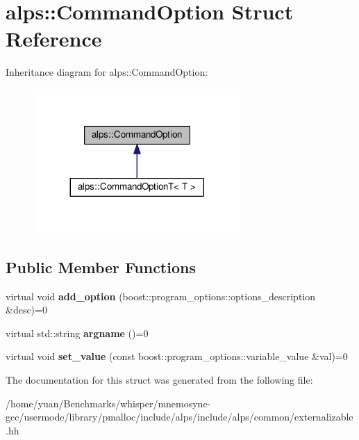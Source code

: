 \hypertarget{structalps_1_1CommandOption}{}\section{alps\+:\+:Command\+Option Struct Reference}
\label{structalps_1_1CommandOption}


Inheritance diagram for alps\+:\+:Command\+Option\+:
\nopagebreak
\begin{figure}[H]
\begin{center}
\leavevmode
\includegraphics[width=224pt]{structalps_1_1CommandOption__inherit__graph}
\end{center}
\end{figure}
\subsection*{Public Member Functions}
\begin{DoxyCompactItemize}
\item 
virtual void {\bfseries add\+\_\+option} (boost\+::program\+\_\+options\+::options\+\_\+description \&desc)=0\hypertarget{structalps_1_1CommandOption_a8c092a8a61f3d12081702ab1fcc6bc06}{}\label{structalps_1_1CommandOption_a8c092a8a61f3d12081702ab1fcc6bc06}

\item 
virtual std\+::string {\bfseries argname} ()=0\hypertarget{structalps_1_1CommandOption_a8315b5ecacc49493f4c9eb9106ae0265}{}\label{structalps_1_1CommandOption_a8315b5ecacc49493f4c9eb9106ae0265}

\item 
virtual void {\bfseries set\+\_\+value} (const boost\+::program\+\_\+options\+::variable\+\_\+value \&val)=0\hypertarget{structalps_1_1CommandOption_abc7792c9b9c2d85ed64e9ebf45e680f0}{}\label{structalps_1_1CommandOption_abc7792c9b9c2d85ed64e9ebf45e680f0}

\end{DoxyCompactItemize}


The documentation for this struct was generated from the following file\+:\begin{DoxyCompactItemize}
\item 
/home/yuan/\+Benchmarks/whisper/mnemosyne-\/gcc/usermode/library/pmalloc/include/alps/include/alps/common/externalizable.\+hh\end{DoxyCompactItemize}

